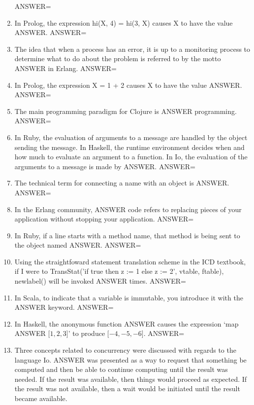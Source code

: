 \documentclass{exam}
\begin{document}
\begin{enumerate}
ANSWER=
\item In Prolog, the expression hi(X, 4) = hi(3, X) causes X to have the value ANSWER.\newline
ANSWER=
\item The idea that when a process has an error, it is up to a monitoring process to determine what to do about the problem is referred to by the motto ANSWER in Erlang.\newline
ANSWER=
\item In Prolog, the expression X = 1 + 2 causes X to have the value ANSWER.\newline
ANSWER=
\item The main programming paradigm for Clojure is ANSWER programming.\newline
ANSWER=
\item In Ruby, the evaluation of arguments to a message are handled by the object sending the message.  In Haskell, the runtime environment decides when and how much to evaluate an argument to a function.  In Io, the evaluation of the arguments to a message is made by ANSWER.\newline
ANSWER=
\item The technical term for connecting a name with an object is ANSWER.\newline
ANSWER=
\item In the Erlang community, ANSWER code refers to replacing pieces of your application without stopping your application.\newline
ANSWER=
\item In Ruby, if a line starts with a method name, that method is being sent to the object named ANSWER.\newline
ANSWER=
\item Using the straightfoward statement translation scheme in the ICD textbook, if I were to TransStat('if true then z := 1 else z := 2', vtable, ftable), newlabel() will be invoked ANSWER times.\newline
ANSWER=
\item In Scala, to indicate that a variable is immutable, you introduce it with the ANSWER keyword.\newline
ANSWER=
\item In Haskell, the anonymous function ANSWER causes the expression `map ANSWER $\lbrack 1, 2, 3\rbrack$' to produce $\lbrack -4, -5, -6\rbrack$.\newline
ANSWER=
\item Three concepts related to concurrency were discussed with regards to the language Io.  ANSWER was presented as a way to request that something be computed and then be able to continue computing until the result was needed.  If the result was available, then things would proceed as expected.  If the result was not available, then a wait would be initiated until the result became available.\newline

\end{enumerate}
\end{document}
